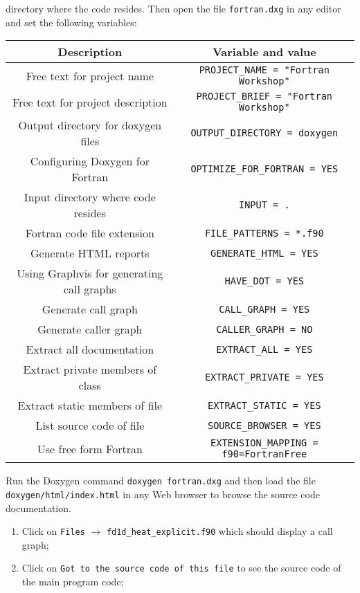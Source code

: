 \documentclass[12pt]{article}
\begin{document}
\begin{enumerate}
directory where the code resides. Then open the file \texttt{fortran.dxg} in any editor and set the 
following variables:
\begin{center}
\begin{tabular}{| c | c |} \hline
{\bf Description} & {\bf Variable and value} \\ \hline
Free text for project name & \texttt{PROJECT\_NAME = "Fortran Workshop"} \\ \hline
Free text for project description & \texttt{PROJECT\_BRIEF = "Fortran Workshop"} \\ \hline
Output directory for doxygen files & \texttt{OUTPUT\_DIRECTORY = doxygen} \\ \hline
Configuring Doxygen for Fortran & \texttt{OPTIMIZE\_FOR\_FORTRAN = YES} \\ \hline
Input directory where code resides & \texttt{INPUT = .} \\ \hline
Fortran code file extension & \texttt{FILE\_PATTERNS = *.f90} \\ \hline
Generate HTML reports & \texttt{GENERATE\_HTML = YES} \\ \hline
Using Graphvis for generating call graphs & \texttt{HAVE\_DOT = YES} \\ \hline
Generate call graph & \texttt{CALL\_GRAPH = YES} \\ \hline
Generate caller graph & \texttt{CALLER\_GRAPH = NO} \\ \hline
Extract all documentation & \texttt{EXTRACT\_ALL = YES} \\ \hline
Extract private members of class & \texttt{EXTRACT\_PRIVATE = YES} \\ \hline
Extract static members of file & \texttt{EXTRACT\_STATIC = YES} \\ \hline
List source code of file & \texttt{SOURCE\_BROWSER = YES} \\ \hline
Use free form Fortran & \texttt{EXTENSION\_MAPPING = f90=FortranFree} \\ \hline
\end{tabular}
\end{center}
Run the Doxygen command \texttt{doxygen fortran.dxg} and then load the file \newline
\texttt{doxygen/html/index.html} in any Web browser to browse the source code documentation.
\begin{enumerate}
\item Click on \texttt{Files} $\rightarrow$ \texttt{fd1d\_heat\_explicit.f90} which should display a call graph;
\item Click on \texttt{Got to the source code of this file} to see the source code of the main program code;

\end{enumerate}
\end{enumerate}
\end{document}
